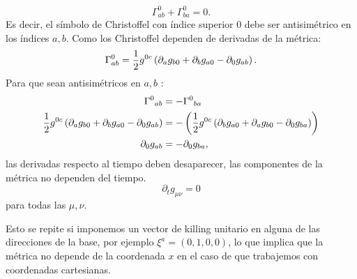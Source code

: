 \begin{equation}
    \Gamma_{a b}^0+\Gamma_{b a}^0=0   . 
\end{equation}
Es decir, el símbolo de Christoffel con índice superior 0 debe ser antisimétrico en los índices $a, b$.
Como los Christoffel dependen de derivadas de la métrica:
\begin{equation}
    \Gamma_{a b}^0=\frac{1}{2} g^{0 c}\left(\partial_{a} g_{b 0}+\partial_{b} g_{a 0}-\partial_{0} g_{a b}\right).
\end{equation}
Para que sean antisimétricos en $a, b$ :
\begin{equation}
\begin{aligned}
    \Gamma^0{}_{a b} & =-\Gamma^0{}_{b a} \\
    \frac{1}{2} g^{0 c}\left(\partial_{a} g_{b 0}+\partial_{b} g_{a 0}-\partial_{0} g_{a b}\right) & = - \left( \frac{1}{2} g^{0 c}\left(\partial_{b} g_{a 0}+\partial_{a} g_{b 0}-\partial_{0} g_{b a }\right)\right) \\
    \partial_{0} g_{a b}& = -\partial_{0} g_{b a }, \\
\end{aligned}    
\end{equation}
las derivadas respecto al tiempo deben desaparecer, las componentes de la métrica no dependen del tiempo.
\begin{equation}
    \partial_t g_{\mu \nu}=0    
\end{equation}
para todas las $\mu, \nu$.
\begin{note}
Esto se repite si imponemos un vector de killing unitario en alguna de las direcciones de la base, por ejemplo $\xi^a=(0,1,0,0)$, lo que implica que la métrica no depende de la coordenada $x$ en el caso de que trabajemos con coordenadas cartesianas. 
\end{note}